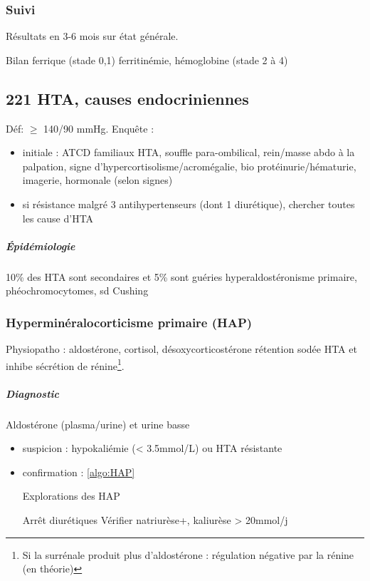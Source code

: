 \documentclass[11pt]{article}
\begin{document}
\subsubsection{Suivi}
\label{sec:org35ed9be}
Résultats en 3-6 mois sur état générale. 

Bilan ferrique (stade 0,1) ferritinémie, hémoglobine (stade 2 à 4)

\subsection{221 HTA, causes endocriniennes}
\label{sec:orgbced6ba}
Déf: \(\ge\) 140/90 mmHg.
Enquête :
\begin{itemize}
\item initiale : ATCD familiaux HTA, souffle para-ombilical, rein/masse abdo à la
palpation, signe d'hypercortisolisme/acromégalie, bio \thus
protéinurie/hématurie, imagerie, hormonale (selon signes)
\item si résistance malgré 3 antihypertenseurs (dont 1 diurétique), chercher toutes
les cause d'HTA
\end{itemize}


\subparagraph{Épidémiologie}
\label{sec:org196fe2a}
10\% des HTA sont secondaires et 5\% sont guéries \thus hyperaldostéronisme
primaire, phéochromocytomes, sd Cushing

\subsubsection{Hyperminéralocorticisme primaire (HAP)}
\label{sec:orgf1a68dd}
Physiopatho : aldostérone, cortisol, désoxycorticostérone \thus rétention sodée
\thus HTA et inhibe sécrétion de rénine\footnote{Si la surrénale produit plus d'aldostérone : régulation négative par la rénine (en théorie)}.

\subparagraph{Diagnostic}
\label{sec:orgb9eb178}
Aldostérone \inc (plasma/urine) et urine basse
\begin{itemize}
\item suspicion : hypokaliémie (< 3.5mmol/L) ou HTA résistante
\item confirmation : \ref{algo:HAP}  
\begin{algorithm}
  \caption{Explorations des HAP}
  \label{algo:HAP}
  Arrêt diurétiques\;
  Vérifier natriurèse+, kaliurèse > 20mmol/j\;
\end{algorithm}
\end{itemize}
\end{document}
